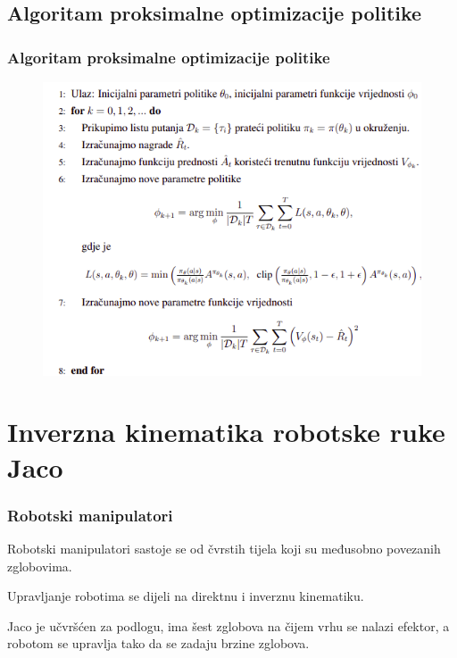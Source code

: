 \documentclass{beamer}
\begin{document}
\subsection{Algoritam proksimalne optimizacije politike}

\begin{frame}
	\frametitle{Algoritam proksimalne optimizacije politike}

	\begin{figure}[h!]
		\centering
		\includegraphics[width=\columnwidth]{img/ppo.png}
	\end{figure}

\end{frame}


\section{Inverzna kinematika robotske ruke Jaco}

\begin{frame}
	\frametitle{Robotski manipulatori}

	Robotski manipulatori sastoje se od čvrstih tijela koji su međusobno povezanih zglobovima.
	\bigskip

	Upravljanje robotima se dijeli na direktnu i inverznu kinematiku.
	\bigskip

	Jaco je učvršćen za podlogu, ima šest zglobova na čijem vrhu se nalazi efektor, a robotom se upravlja tako da se zadaju brzine zglobova.

\end{frame}
\end{document}
